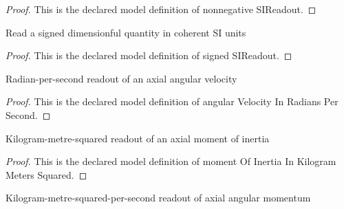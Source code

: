 \begin{proof}
  This is the declared model definition of nonnegative SIReadout.
\end{proof}
\begin{definition}
  \label{def:physics:phyx-mini-0826:phyxminiproblems-problemphyxmini0826-signedsireadout}
  Read a signed dimensionful quantity in coherent SI units
\end{definition}
\begin{proof}
  This is the declared model definition of signed SIReadout.
\end{proof}
\begin{definition}
  \label{def:physics:phyx-mini-0826:phyxminiproblems-problemphyxmini0826-angularvelocityinradianspersecond}
  Radian-per-second readout of an axial angular velocity
\end{definition}
\begin{proof}
  This is the declared model definition of angular Velocity In Radians Per Second.
\end{proof}
\begin{definition}
  \label{def:physics:phyx-mini-0826:phyxminiproblems-problemphyxmini0826-momentofinertiainkilogrammeterssquared}
  Kilogram-metre-squared readout of an axial moment of inertia
\end{definition}
\begin{proof}
  This is the declared model definition of moment Of Inertia In Kilogram Meters Squared.
\end{proof}
\begin{definition}
  \label{def:physics:phyx-mini-0826:phyxminiproblems-problemphyxmini0826-angularmomentuminkilogrammeterssquaredpersecond}
  Kilogram-metre-squared-per-second readout of axial angular momentum
\end{definition}
